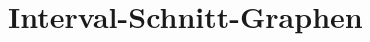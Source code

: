 \documentclass[../main.tex]{subfiles}
\begin{document}
\chapter{Interval-Schnitt-Graphen}
\label{chapter:interval-schnitt-graphen}
\end{document}
